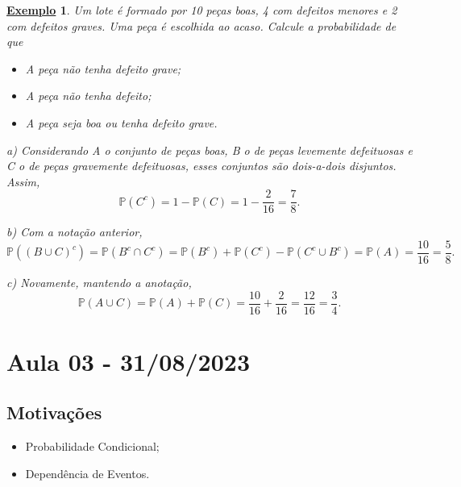 \documentclass{article}
\newtheorem{example}{\underline{Exemplo}}
\begin{document}
\begin{example}
  Um lote é formado por 10 peças boas, 4 com defeitos menores e 2 com defeitos graves. Uma peça é escolhida ao acaso. Calcule a probabilidade de que 
  \begin{itemize}
    \item[a)] A peça não tenha defeito grave;
    \item[b)] A peça não tenha defeito;
    \item[c)] A peça seja boa ou tenha defeito grave.
  \end{itemize}
  a) Considerando A o conjunto de peças boas, B o de peças levemente defeituosas e C o de peças gravemente defeituosas, esses conjuntos são dois-a-dois disjuntos. Assim, 
  \[
    \mathbb{P}(C^{c}) = 1 - \mathbb{P}(C) = 1 - \frac{2}{16} = \frac{7}{8}.
  \]

  b) Com a notação anterior, 
  \[
    \mathbb{P}((B\cup C)^{c}) = \mathbb{P}(B^{c}\cap C^{c}) = \mathbb{P}(B^{c}) + \mathbb{P}(C^{c}) - \mathbb{P}(C^{c}\cup B^{c}) = \mathbb{P}(A) = \frac{10}{16} = \frac{5}{8}.
  \]

  c) Novamente, mantendo a anotação, 
  \[
    \mathbb{P}(A\cup C) = \mathbb{P}(A) + \mathbb{P}(C) = \frac{10}{16} + \frac{2}{16} = \frac{12}{16} = \frac{3}{4}.
  \]
\end{example}
\newpage

\section{Aula 03 - 31/08/2023}
\subsection{Motivações}
\begin{itemize}
  \item Probabilidade Condicional;
  \item Dependência de Eventos.
\end{itemize}
\end{document}
